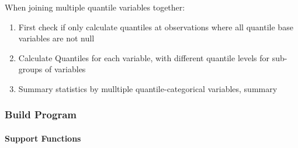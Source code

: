 \documentclass[
]{book}
\providecommand{\tightlist}{%
  \setlength{\itemsep}{0pt}\setlength{\parskip}{0pt}}
\begin{document}
When joining multiple quantile variables together:

\begin{enumerate}
\def\labelenumi{\arabic{enumi}.}
\tightlist
\item
  First check if only calculate quantiles at observations where all quantile base variables are not null
\item
  Calculate Quantiles for each variable, with different quantile levels for sub-groups of variables
\item
  Summary statistics by mulltiple quantile-categorical variables, summary
\end{enumerate}

\hypertarget{build-program-1}{%
\subsubsection{Build Program}\label{build-program-1}}

\hypertarget{support-functions}{%
\paragraph{Support Functions}\label{support-functions}}
\end{document}
